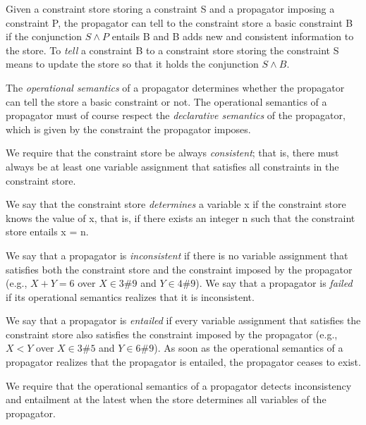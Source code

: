 \documentclass[a4paper]{scrartcl}
\begin{document}
Given a constraint store storing a constraint S and a propagator 
imposing a constraint P, 
the propagator can tell to the constraint store a basic 
constraint B if the conjunction $ S \wedge{} P$ 
entails B and B adds new and consistent information to the 
store. To {\it tell} a constraint B to a 
constraint store storing the constraint S means to update 
the store so that it holds the 
conjunction $ S \wedge{} B$.\\
\par
The {\it operational semantics} of a propagator determines 
whether the propagator can tell the store 
a basic constraint or not. The operational semantics of a 
propagator must of course respect 
the {\it declarative semantics} of the propagator, which is 
given by the constraint the propagator imposes.\\ 
\par
We require that the constraint store be always {\it consistent}; 
that is, there must always be at least 
one variable assignment that satisfies all constraints in the 
constraint store.\\
\par
We say that the constraint store {\it determines} a variable 
x if the constraint store knows the value of x, 
that is, if there exists an integer n such that the constraint 
store entails x = n.\\
\par
We say that a propagator is {\it inconsistent} if there is 
no variable assignment that satisfies 
both the constraint store and the constraint imposed by the 
propagator 
(e.g., $ X + Y = 6 $ over $ X \in 3\#9 $ and $ Y \in 4\#9 $). 
We say that a propagator is {\it failed} if its 
operational semantics realizes that it is inconsistent.\\
\par
We say that a propagator is {\it entailed} if every variable 
assignment that satisfies the constraint 
store also satisfies the constraint imposed by the propagator 
(e.g., $ X < Y $ over $ X \in 3\#5 $ and $ Y \in 6\#9 $). 
As soon as the operational semantics of a 
propagator realizes that the propagator is entailed, the 
propagator ceases to exist.\\
\par
We require that the operational semantics of a propagator 
detects inconsistency and entailment at the 
latest when the store determines all variables of the 
propagator.\\
\par
\end{document}
